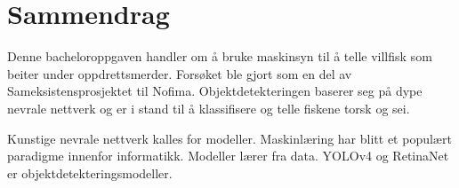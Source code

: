 \section*{Sammendrag}










Denne bacheloroppgaven handler om å bruke maskinsyn til å telle villfisk som beiter under oppdrettsmerder. Forsøket ble gjort som en del av Sameksistensprosjektet til Nofima. Objektdetekteringen baserer seg på dype nevrale nettverk og er i stand til å klassifisere og telle fiskene torsk og sei.

Kunstige nevrale nettverk kalles for modeller. Maskinlæring har blitt et populært paradigme innenfor informatikk. Modeller lærer fra data. YOLOv4 og RetinaNet er objektdetekteringsmodeller.

